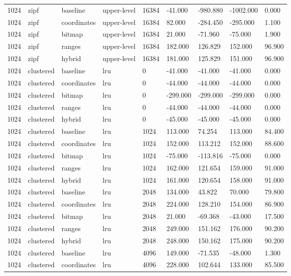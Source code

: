 \begin{tabular}{lllllllll}
1024 & zipf & baseline & upper-level & 16384 & -41.000 & -980.880 & -1002.000 & 0.000 \\
1024 & zipf & coordinates & upper-level & 16384 & 82.000 & -284.450 & -295.000 & 1.100 \\
1024 & zipf & bitmap & upper-level & 16384 & 21.000 & -71.960 & -75.000 & 1.900 \\
1024 & zipf & ranges & upper-level & 16384 & 182.000 & 126.829 & 152.000 & 96.900 \\
1024 & zipf & hybrid & upper-level & 16384 & 181.000 & 125.829 & 151.000 & 96.900 \\
1024 & clustered & baseline & lru & 0 & -41.000 & -41.000 & -41.000 & 0.000 \\
1024 & clustered & coordinates & lru & 0 & -44.000 & -44.000 & -44.000 & 0.000 \\
1024 & clustered & bitmap & lru & 0 & -299.000 & -299.000 & -299.000 & 0.000 \\
1024 & clustered & ranges & lru & 0 & -44.000 & -44.000 & -44.000 & 0.000 \\
1024 & clustered & hybrid & lru & 0 & -45.000 & -45.000 & -45.000 & 0.000 \\
1024 & clustered & baseline & lru & 1024 & 113.000 & 74.254 & 113.000 & 84.400 \\
1024 & clustered & coordinates & lru & 1024 & 152.000 & 113.212 & 152.000 & 88.600 \\
1024 & clustered & bitmap & lru & 1024 & -75.000 & -113.816 & -75.000 & 0.000 \\
1024 & clustered & ranges & lru & 1024 & 162.000 & 121.654 & 159.000 & 91.000 \\
1024 & clustered & hybrid & lru & 1024 & 161.000 & 120.654 & 158.000 & 91.000 \\
1024 & clustered & baseline & lru & 2048 & 134.000 & 43.822 & 70.000 & 79.800 \\
1024 & clustered & coordinates & lru & 2048 & 224.000 & 128.210 & 154.000 & 86.900 \\
1024 & clustered & bitmap & lru & 2048 & 21.000 & -69.368 & -43.000 & 17.500 \\
1024 & clustered & ranges & lru & 2048 & 249.000 & 151.162 & 176.000 & 90.200 \\
1024 & clustered & hybrid & lru & 2048 & 248.000 & 150.162 & 175.000 & 90.200 \\
1024 & clustered & baseline & lru & 4096 & 149.000 & -71.535 & -48.000 & 1.300 \\
1024 & clustered & coordinates & lru & 4096 & 228.000 & 102.644 & 133.000 & 85.500 \\

\end{tabular}

